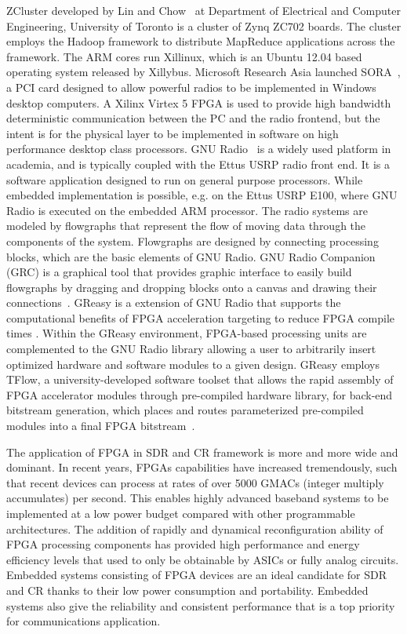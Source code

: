 ZCluster developed by Lin and Chow~\cite{Lin2013} at Department of Electrical and Computer Engineering, University of Toronto is a cluster of Zynq ZC702 boards. The cluster employs the Hadoop framework to distribute MapReduce applications across the framework. The ARM cores run Xillinux, which is an Ubuntu 12.04 based operating system released by Xillybus.
Microsoft Research Asia launched SORA~\cite{tan2011sora}, a PCI card designed to allow powerful radios to be implemented in Windows desktop computers.
A Xilinx Virtex 5 FPGA is used to provide high bandwidth deterministic communication between the PC and the radio frontend, but the intent is for the physical layer to be implemented in software on high performance desktop class processors.
GNU Radio~\cite{gnuradio} is a widely used platform in academia, and is typically coupled with the Ettus USRP radio front end. It is a software application designed to run on general purpose processors. While embedded implementation is possible, e.g. on the Ettus USRP E100, where GNU Radio is executed on the embedded ARM processor. The radio systems are modeled by flowgraphs that represent the flow of moving data through the components of the system. Flowgraphs are designed by connecting processing blocks, which are the basic elements of GNU Radio. GNU Radio Companion (GRC) is a graphical tool that provides graphic interface to easily build flowgraphs by dragging and dropping blocks onto a canvas and drawing their connections~\cite{GRC2009}. 
GReasy is a extension of GNU Radio that supports the computational benefits of FPGA acceleration targeting to reduce FPGA compile times \cite{Marlow2014}. Within the GReasy environment, FPGA-based processing units are complemented to the GNU Radio library allowing a user to arbitrarily insert optimized hardware and software modules to a given design. GReasy employs TFlow, a university-developed software toolset that allows the rapid assembly of FPGA accelerator modules through pre-compiled hardware library, for back-end bitstream generation, which places and routes parameterized pre-compiled modules into a final FPGA bitstream~\cite{Love2013}.

The application of FPGA in SDR and CR framework is more and more wide and dominant. In recent years, FPGAs capabilities have increased tremendously, such that recent devices can process at rates of over 5000 GMACs (integer multiply accumulates) per second. This enables highly advanced baseband systems to be implemented at a low power budget compared with other programmable architectures.
The addition of rapidly and dynamical reconfiguration ability of FPGA processing components has provided high performance and energy efficiency levels that used to only be obtainable by ASICs or fully analog circuits. Embedded systems consisting of FPGA devices are an ideal candidate for SDR and CR thanks to their low power consumption and portability. 
Embedded systems also give the reliability and consistent performance that is a top priority for communications application. 


